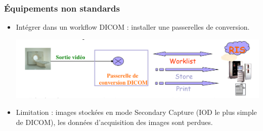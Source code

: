\frame
{
	\frametitle{\'Equipements non standards}
	
	\begin{itemize}
		\item Int\'egrer dans un workflow DICOM : installer une passerelles de conversion.
		
		\begin{center}
			\includegraphics[width=\linewidth]{./figures/passerelle.png}
		\end{center}
		\item Limitation : images stock\'ees en mode Secondary Capture (IOD le plus simple de DICOM), les donn\'ees d'acquisition des images sont perdues.
	\end{itemize}
}

